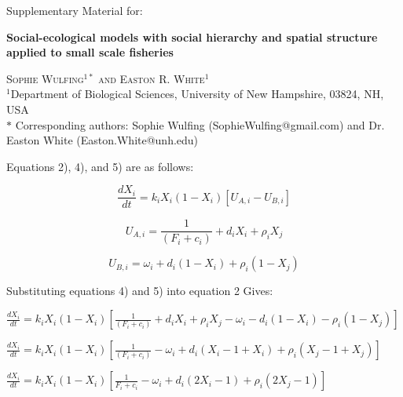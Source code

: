 \documentclass[
]{article}
\author{}
\date{\vspace{-2.5em}}
\begin{document}
\begin{center}
Supplementary Material for:
    
\textbf{\Large Social-ecological models with social hierarchy and spatial structure applied to small scale fisheries}
    
\textsc{Sophie Wulfing$^{1*}$ and Easton R. White$^{1}$\\}
\vspace{3 mm}
\normalsize{\indent $^1$Department of Biological Sciences, University of New Hampshire, 03824, NH, USA\\}
$\text{*}$ Corresponding authors: Sophie Wulfing (SophieWulfing@gmail.com) and Dr. Easton White (Easton.White@unh.edu)
\end{center}

\pagebreak

\linenumbers

Equations 2), 4), and 5) are as follows:

\begin{equation}
\tag{2}
\frac{dX_i}{dt} = k_iX_i(1-X_i)[U_{A,i} - U_{B,i}]
\end{equation}

\begin{equation}
\tag{4}
U_{A,i} = \frac{1}{(F_i + c_i)} + d_iX_i + \rho_i X_j
\end{equation}

\begin{equation}
\tag{5}
U_{B,i} = \omega_i + d_i(1-X_i) + \rho_i(1-X_j)
\end{equation}

Substituting equations 4) and 5) into equation 2 Gives:

\(\frac{dX_i}{dt} = k_iX_i(1-X_i)[\frac{1}{(F_i + c_i)} + d_iX_i + \rho_i X_j - \omega_i - d_i(1-X_i) - \rho_i(1-X_j)]\)

\(\frac{dX_i}{dt} = k_iX_i(1-X_i)[\frac{1}{(F_i + c_i)} - \omega_i + d_i(X_i-1+X_i) + \rho_i(X_j-1+X_j)]\)

\(\frac{dX_i}{dt} = k_iX_i(1-X_i) [\frac{1}{F_i+c_i} - \omega_i + d_i(2X_i - 1) + \rho_i(2X_j - 1)]\)
\end{document}

